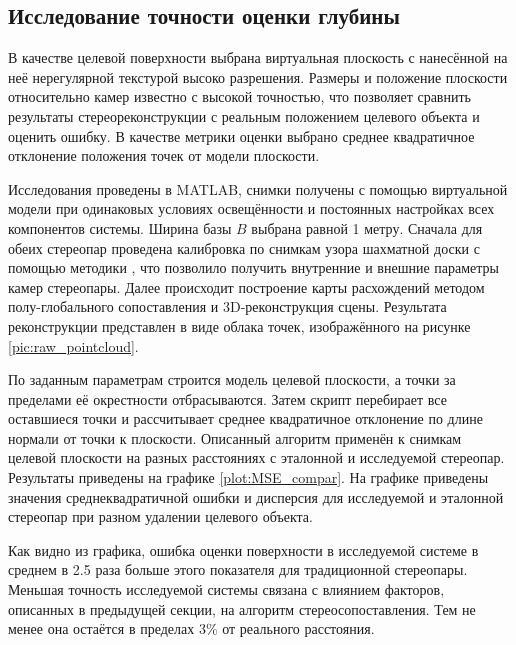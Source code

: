 
\subsection{Исследование точности оценки глубины}  %

В качестве целевой поверхности выбрана виртуальная плоскость с нанесённой на неё нерегулярной текстурой высоко разрешения. Размеры и
положение плоскости относительно камер известно с высокой точностью, что позволяет сравнить результаты стереореконструкции
с реальным положением целевого объекта и оценить ошибку. В качестве метрики оценки выбрано среднее квадратичное отклонение
положения точек от модели плоскости. 

Исследования проведены в MATLAB, снимки получены с помощью виртуальной модели при  одинаковых условиях освещённости и 
постоянных  настройках всех  компонентов системы.  Ширина базы $B$ выбрана равной 1  метру.  Сначала для обеих стереопар 
проведена калибровка по снимкам узора шахматной доски с помощью методики \cite{stereo_calib}, что позволило получить 
внутренние и внешние параметры камер стереопары. %
Далее происходит построение карты расхождений методом полу-глобального  сопоставления \cite{SGBM} и 3D-реконструкция сцены. 
Результата реконструкции представлен  в виде облака точек,  изображённого на рисунке \ref{pic:raw_pointcloud}.

По заданным параметрам строится модель целевой плоскости, а точки за пределами её окрестности отбрасываются. %
Затем скрипт перебирает все оставшиеся точки и рассчитывает среднее квадратичное отклонение по длине нормали от 
точки к плоскости. 
Описанный алгоритм применён к снимкам целевой плоскости на разных расстояниях с эталонной и исследуемой стереопар.
Результаты приведены на графике \ref{plot:MSE_compar}. На графике приведены значения среднеквадратичной ошибки и
дисперсия для исследуемой и эталонной стереопар при разном удалении целевого объекта.


Как видно из графика, ошибка оценки поверхности в исследуемой системе в среднем в 2.5 раза больше этого показателя для
традиционной стереопары. Меньшая точность исследуемой системы связана с влиянием факторов, описанных в предыдущей секции,
на алгоритм стереосопоставления.  Тем не менее она остаётся в пределах $3\%$ от реального расстояния.  %


%